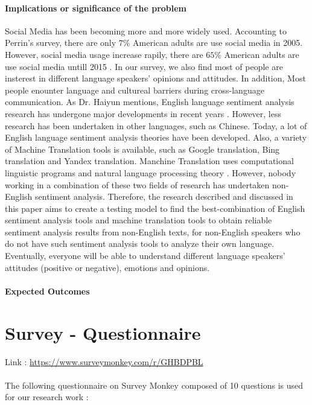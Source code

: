 \documentclass[conference]{IEEEtran}
\begin{document}
\paragraph{Implications or significance of the problem}
Social Media has been becoming more and more widely used. Accounting to Perrin's
survey, there are only $7\%$ American adults are use social media in 2005.
However, social media usage increase rapily, there are $65\%$ American adults are use
social media untill 2015 \cite{perrin2015social}. In our survey, we also find most of people
are insterest in different language speakers' opinions and attitudes. In
addition,
Most people enounter language and cultureal barriers during cross-language
communication.
As Dr. Haiyun mentions, English language sentiment analysis research has
undergone major developments in recent years \cite{ChineseSentimentAnalysis}.
However, less research has been undertaken in other languages, such as Chinese.
Today, a lot of English language sentiment analysis theories have been
developed. Also, a variety of Machine Translation tools is available, such as Google
translation, Bing translation and Yandex translation.
Manchine Translation uses computational linguistic programs and natural language
processing theory \cite{machineTranslation}.
However, nobody working in a combination of these two fields of research has undertaken non-English
sentiment analysis. Therefore, the research described and discussed in this paper aims to create a testing model to find the best-combination of English
sentiment analysis tools and machine translation tools to obtain reliable
sentiment analysis results from non-English texts, for non-English speakers who
do not have such sentiment analysis tools to analyze their own language.
Eventually, everyone will be able to understand different language speakers'
attitudes (positive or negative), emotions and opinions.\\
\paragraph{Expected Outcomes}

\section{Survey - Questionnaire}\label{survey}

Link : \hyperlink{https://www.surveymonkey.com/r/GHBDPBL}{https://www.surveymonkey.com/r/GHBDPBL}


\paragraph{}
The following questionnaire on Survey Monkey composed of 10 questions is used for our research work :
\end{document}
